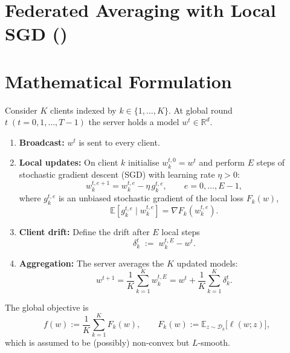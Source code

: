 \documentclass{article}
\newcommand{\E}{\mathbb{E}}
\newcommand{\R}{\mathbb{R}}
\newcommand{\fedavg}{\text{FedAvg}}
\begin{document}
\section*{Federated Averaging with Local SGD (\fedavg)}

\section*{Mathematical Formulation}
Consider $K$ clients indexed by $k\in\{1,\dots,K\}$.  
At global round $t\;(t=0,1,\dots,T-1)$ the server holds a model $w^{t}\in\R^{d}$.  

\begin{enumerate}[label=\arabic*)]
\item \textbf{Broadcast:} $w^{t}$ is sent to every client.
\item \textbf{Local updates:} On client $k$ initialise $w_{k}^{t,0}=w^{t}$ and perform $E$ steps of stochastic gradient descent (SGD) with learning rate $\eta>0$:
\begin{equation}
\label{eq:local-sgd}
w_{k}^{t,e+1}=w_{k}^{t,e}-\eta\,g_{k}^{t,e},
\qquad e=0,\dots,E-1,
\end{equation}
where $g_{k}^{t,e}$ is an unbiased stochastic gradient of the local loss $F_k(w)$,
\[
\E\!\left[g_{k}^{t,e}\mid w_{k}^{t,e}\right]=\nabla F_k\!\left(w_{k}^{t,e}\right).
\]
\item \textbf{Client drift:} Define the drift after $E$ local steps
\begin{equation}
\label{eq:drift}
\delta_k^{t}\;:=\;w_{k}^{t,E}-w^{t}.
\end{equation}
\item \textbf{Aggregation:} The server averages the $K$ updated models:
\begin{equation}
\label{eq:agg}
w^{t+1}= \frac{1}{K}\sum_{k=1}^{K} w_{k}^{t,E}
       = w^{t}+ \frac{1}{K}\sum_{k=1}^{K}\delta_k^{t}.
\end{equation}
\end{enumerate}

The global objective is
\[
f(w):=\frac{1}{K}\sum_{k=1}^{K}F_k(w),\qquad 
F_k(w):=\E_{z\sim\mathcal{D}_k}\!\big[\ell(w;z)\big],
\]
which is assumed to be (possibly) non‑convex but $L$‑smooth.
\end{document}
